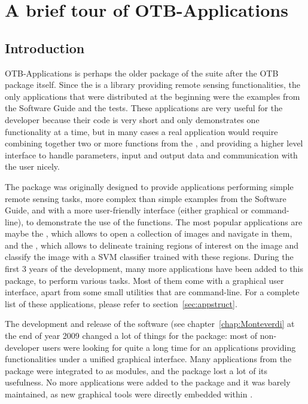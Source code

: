 \chapter{A brief tour of OTB-Applications}\label{chap:otb-applications}

\section{Introduction}\label{sec:appintro}

OTB-Applications is perhaps the older package of the \otb
suite after the OTB package itself. Since the \otb is a
library providing remote sensing functionalities, the only
applications that were distributed at the beginning were the examples
from the Software Guide and the tests. These applications are very
useful for the developer because their code is very short and only
demonstrates one functionality at a time, but in many cases a real
application would require combining together two or more functions
from the \otb, and providing a higher level interface to
handle parameters, input and output data and communication with the
user nicely.

The \app package was originally designed to provide applications
performing simple remote sensing tasks, more complex than simple
examples from the Software Guide, and with a more user-friendly
interface (either graphical or command-line), to demonstrate the use
of the \otb functions. The most popular applications are maybe the
, which allows to open a collection
of images and navigate in them, and the
, which allows to
delineate training regions of interest on the image and classify the
image with a SVM classifier trained with these regions. During the
first 3 years of the \otb development, many more applications have
been added to this package, to perform various tasks. Most of them
come with a graphical user interface, apart from some small utilities
that are command-line.  For a complete list of these applications,
please refer to section~\ref{sec:appstruct}.

The development and release of the \mont software (see
chapter~\ref{chap:Monteverdi} at the end of year 2009 changed a lot of
things for the \app package: most of non-developer users were looking
for quite a long time for an applications providing \otb
functionalities under a unified graphical interface. Many applications
from the \app package were integrated to \mont as modules, and the
\app package lost a lot of its usefulness. No more applications were
added to the package and it was barely maintained, as new graphical
tools were directly embedded within \mont.

